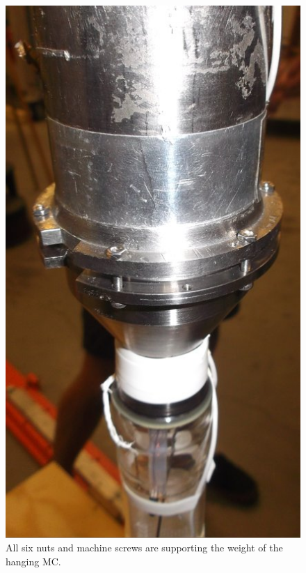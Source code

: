 \begin{figure}[htbp!]
\begin{minipage}{0.45\textwidth}
 \includegraphics[width=\textwidth]{./img/indium-seal-mc-all-six-screws-in.jpg}
 \caption{All six nuts and machine screws are supporting the weight of the hanging MC.}
 \label{fig:indium-seal-mc-all-six-screws-in}
 \end{minipage}
 
 
\end{figure}



